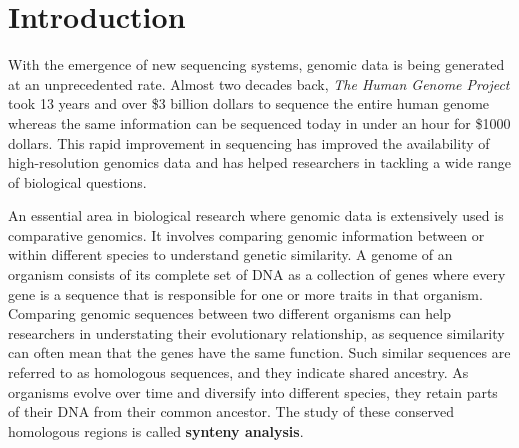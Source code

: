 \chapter{Introduction}

With the emergence of new sequencing systems, genomic data is being generated at an unprecedented rate. Almost two decades back, \textit{The Human Genome Project} took 13 years and over \$3 billion dollars to sequence the entire human genome whereas the same information can be sequenced today in under an hour for \$1000 dollars. This rapid improvement in sequencing has improved the availability of high-resolution genomics data and has helped researchers in tackling a wide range of biological questions.

An essential area in biological research where genomic data is extensively used is comparative genomics. It involves comparing genomic information between or within different species to understand genetic similarity. A genome of an organism consists of its complete set of DNA as a collection of genes where every gene is a sequence that is responsible for one or more traits in that organism. Comparing genomic sequences between two different organisms can help researchers in understating their evolutionary relationship, as sequence similarity can often mean that the genes have the same function. Such similar sequences are referred to as homologous sequences, and they indicate shared ancestry. As organisms evolve over time and diversify into different species, they retain parts of their DNA from their common ancestor. The study of these conserved homologous regions is called \textbf{synteny analysis}. 

